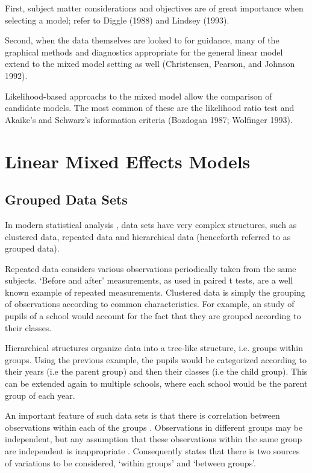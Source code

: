 \documentclass[12pt, a4paper]{report}
\begin{document}
First, subject matter considerations and objectives are of great
importance when selecting a model; refer to Diggle (1988) and
Lindsey (1993).

Second, when the data themselves are looked to for guidance, many
of the graphical methods and diagnostics appropriate for the
general linear model extend to the mixed model setting as well
(Christensen, Pearson, and Johnson 1992).

Likelihood-based approachs to the mixed model allow the comparison
of candidate models. The most common of these are the likelihood
ratio test and Akaike's and Schwarz's information criteria
(Bozdogan 1987; Wolfinger 1993).


\chapter{Linear Mixed Effects Models}

\section{Grouped Data Sets}
In modern statistical analysis , data sets have very complex
structures, such as  clustered data, repeated data and
hierarchical data (henceforth referred to as grouped data).

Repeated data considers various observations periodically taken
from the same subjects. `Before and after' measurements, as used
in paired t tests, are a well known example of repeated
measurements. Clustered data is simply the grouping of
observations according to common characteristics. For example, an
study of pupils of a school would account for the fact that they
are grouped according to their classes.

Hierarchical structures organize data into a tree-like structure,
i.e. groups within groups. Using the previous example, the pupils
would be categorized according to their years (i.e the parent
group) and then their classes (i.e the child group). This can be
extended again to multiple schools, where each school would be the
parent group of each year.

An important feature of such data sets is that there is
correlation between observations within each of the groups
\citep{Faraway}. Observations in different groups may be
independent, but any assumption that these observations within the
same group are independent is inappropriate . Consequently
\citet{Demi} states that there is two sources of variations to be
considered, `within groups' and `between groups'.
\end{document}

